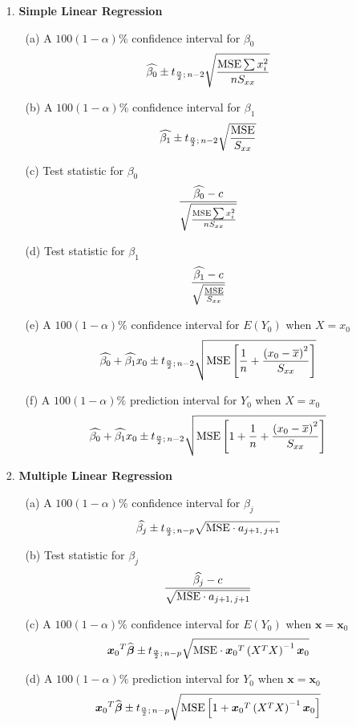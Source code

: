 \documentclass[12pt]{article}
\newcommand{\bs}{\boldsymbol}
\begin{document}
\begin{enumerate}
\item[1.]
{\bf Simple Linear Regression}
\begin{enumerate}
\item[(a)]
A $100(1 - \alpha)\%$ confidence interval for $\beta_0$
$$
\widehat{\beta_0} \pm t_{\frac{\alpha}{2};\,n - 2}\sqrt{\frac{{\rm MSE}\sum x_i^2}{nS_{xx}}}
$$
\item[(b)]
A $100(1 - \alpha)\%$ confidence interval for $\beta_1$
$$
\widehat{\beta_1} \pm t_{\frac{\alpha}{2};\,n - 2}\sqrt{\frac{{\rm MSE}}{S_{xx}}}
$$
\item[(c)]
Test statistic for $\beta_0$
$$
\frac{\widehat{\beta_0} - c}{\sqrt{\frac{{\rm MSE}\sum x_i^2}{nS_{xx}}}}
$$
\item[(d)]
Test statistic for $\beta_1$
$$
\frac{\widehat{\beta_1} - c}{\sqrt{\frac{{\rm MSE}}{S_{xx}}}}
$$
\item[(e)]
A $100(1 - \alpha)\%$ confidence interval for $E(Y_0)$ when $X = x_0$
$$
\widehat{\beta_0} + \widehat{\beta_1}x_0 \pm t_{\frac{\alpha}{2};\,n - 2}\sqrt{{\rm MSE}\left[\frac{1}{n} + \frac{\left(x_0 - \overline{x}\right)^2}{S_{xx}}\right]}
$$
\item[(f)]
A $100(1 - \alpha)\%$ prediction interval for $Y_0$ when $X = x_0$
$$
\widehat{\beta_0} + \widehat{\beta_1}x_0 \pm t_{\frac{\alpha}{2};\,n - 2}\sqrt{{\rm MSE}\left[1 + \frac{1}{n} + \frac{\left(x_0 - \overline{x}\right)^2}{S_{xx}}\right]}
$$
\end{enumerate}
\item[2.]
{\bf Multiple Linear Regression}
\begin{enumerate}
\item[(a)]
A $100(1 - \alpha)\%$ confidence interval for $\beta_j$
$$
\widehat{\beta_j} \pm t_{\frac{\alpha}{2};\,n - p}\sqrt{{\rm MSE} \cdot a_{j + 1,\,j + 1}}
$$
\item[(b)]
Test statistic for $\beta_j$
$$
\frac{\widehat{\beta_j} - c}{\sqrt{{\rm MSE} \cdot a_{j + 1,\,j + 1}}}
$$
\item[(c)]
A $100(1 - \alpha)\%$ confidence interval for $E(Y_0)$ when ${\bs x} = {\bs x_0}$
$$
{\bs x_0}^T\widehat{\bs{\beta}} \pm t_{\frac{\alpha}{2};\,n - p}\sqrt{{\rm MSE} \cdot {\bs x_0}^T\left(X^T X\right)^{-1}{\bs x_0}}
$$
\item[(d)]
A $100(1 - \alpha)\%$ prediction interval for $Y_0$ when ${\bs x} = {\bs x_0}$
$$
{\bs x_0}^T\widehat{\bs{\beta}} \pm t_{\frac{\alpha}{2};\,n - p}\sqrt{{\rm MSE}\left[1 + {\bs x_0}^T\left(X^T X\right)^{-1}{\bs x_0}\right]}
$$
\end{enumerate}
\end{enumerate}
\end{document}
